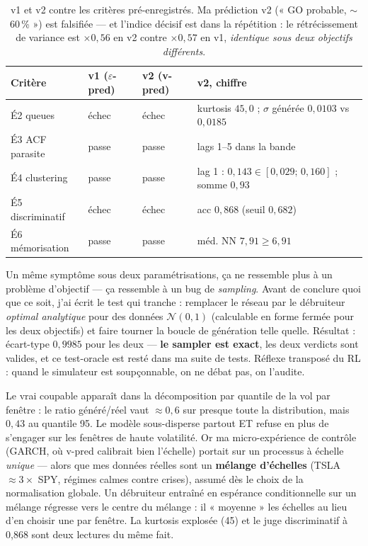 \documentclass[11pt,a4paper]{article}
\newcommand{\ok}[1]{\textcolor{okgreen}{#1}}
\newcommand{\ko}[1]{\textcolor{kored}{#1}}
\begin{document}
\begin{table}[H]
\centering\small
\begin{tabular}{@{}llll@{}}
\toprule
\textbf{Critère} & \textbf{v1 ($\varepsilon$-pred)} & \textbf{v2 (v-pred)} & \textbf{v2, chiffre} \\
\midrule
É2 queues        & \ko{échec} & \ko{échec} & kurtosis $45{,}0$ ; $\sigma$ générée $0{,}0103$ vs $0{,}0185$ \\
É3 ACF parasite  & \ok{passe} & \ok{passe} & lags 1--5 dans la bande \\
É4 clustering    & \ok{passe} & \ok{passe} & lag 1 : $0{,}143 \in [0{,}029;\,0{,}160]$ ; somme $0{,}93$ \\
É5 discriminatif & \ko{échec} & \ko{échec} & acc $0{,}868$ (seuil $0{,}682$) \\
É6 mémorisation  & \ok{passe} & \ok{passe} & méd. NN $7{,}91 \geq 6{,}91$ \\
\bottomrule
\end{tabular}
\caption{v1 et v2 contre les critères pré-enregistrés. Ma prédiction v2 (« GO probable,
$\sim$60\,\% ») est falsifiée --- et l'indice décisif est dans la répétition : le
rétrécissement de variance est $\times 0{,}56$ en v2 contre $\times 0{,}57$ en v1,
\emph{identique sous deux objectifs différents}.}
\label{tab:ddpm_v2}
\end{table}

Un même symptôme sous deux paramétrisations, ça ne ressemble plus à un problème
d'objectif --- ça ressemble à un bug de \emph{sampling}. Avant de conclure quoi que ce
soit, j'ai écrit le test qui tranche : remplacer le réseau par le débruiteur
\emph{optimal analytique} pour des données $\mathcal{N}(0,1)$ (calculable en forme
fermée pour les deux objectifs) et faire tourner la boucle de génération telle
quelle. Résultat : écart-type $0{,}9985$ pour les deux --- \textbf{le sampler est
exact}, les deux verdicts sont valides, et ce test-oracle est resté dans ma suite de
tests. Réflexe transposé du RL : quand le simulateur est soupçonnable, on ne débat
pas, on l'audite.

Le vrai coupable apparaît dans la décomposition par quantile de la vol par fenêtre :
le ratio généré/réel vaut $\approx 0{,}6$ sur presque toute la distribution, mais
$0{,}43$ au quantile 95. Le modèle sous-disperse partout ET refuse en plus de
s'engager sur les fenêtres de haute volatilité. Or ma micro-expérience de contrôle
(GARCH, où v-pred calibrait bien l'échelle) portait sur un processus à échelle
\emph{unique} --- alors que mes données réelles sont un \textbf{mélange d'échelles}
(TSLA $\approx 3\times$ SPY, régimes calmes contre crises), assumé dès le choix de la
normalisation globale. Un débruiteur entraîné en espérance conditionnelle sur un
mélange régresse vers le centre du mélange : il « moyenne » les échelles au lieu d'en
choisir une par fenêtre. La kurtosis explosée (45) et le juge discriminatif à 0{,}868
sont deux lectures du même fait.
\end{document}

